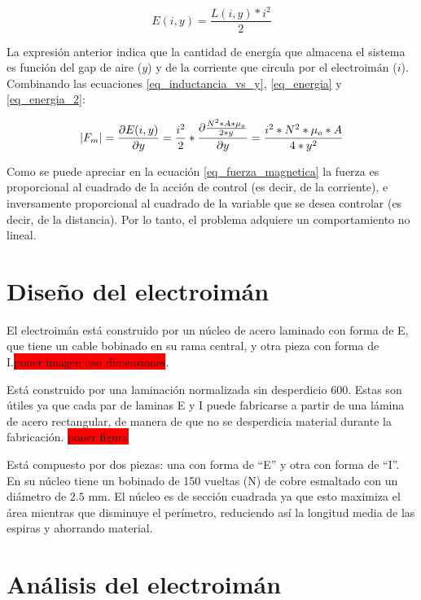 \begin{equation}\label{eq_energia_2}
	E(i,y)=\frac{L(i,y)*i^{2}}{2}
\end{equation}

\noindent La expresión anterior indica que la cantidad de energía que almacena el sistema es función del gap de aire ($y$) y de la corriente que circula por el electroimán ($i$). Combinando las ecuaciones \ref{eq_inductancia_vs_y}, \ref{eq_energia} y \ref{eq_energia_2}:

\begin{equation}\label{eq_fuerza_magnetica}
	\lvert F_{m}\rvert=\frac{\partial{E(i,y)}}{\partial{y}}=\frac{i^{2}}{2}*\frac{\partial{\frac{{N^{2}*A*\mu_{o}}}{2*y}}}{\partial{y}}=\frac{i^{2}*N^{2}*\mu_{o}*A}{4*y^{2}}
\end{equation}

\noindent Como se puede apreciar en la ecuación \ref{eq_fuerza_magnetica} la fuerza es proporcional al cuadrado de la acción de control (es decir, de la corriente), e inversamente proporcional al cuadrado de la variable que se desea controlar (es decir, de la distancia). Por lo tanto, el problema adquiere un comportamiento no lineal.

\section{Diseño del electroimán}

\noindent El electroimán está construido por un núcleo de acero laminado con forma de E, que tiene un cable bobinado en su rama central, y otra pieza con forma de I.\colorbox{red}{poner imagen con dimensiones}. 
% 

Está construido por una laminación normalizada sin desperdicio 600. Estas son útiles ya que cada par de laminas E y I puede fabricarse a partir de una lámina de acero rectangular, de manera de que no se desperdicia material durante la fabricación. \colorbox{red}{poner figura}

Está compuesto por dos piezas: una con forma de “E” y otra con forma de “I”. En su núcleo tiene un bobinado de 150 vueltas (N) de cobre esmaltado con un diámetro de $2.5$ mm. El núcleo es de sección cuadrada ya que esto maximiza el área mientras que disminuye el perímetro, reduciendo así la longitud media de las espiras y ahorrando material. 

\section{Análisis del electroimán}

